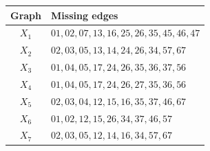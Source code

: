 \begin{tabular}{cl}
\toprule
Graph & Missing edges\\\midrule
\(X_1\)&\(01,02,07,13,16,25,26,35,45,46,47\)\\
\(X_2\)&\(02,03,05,13,14,24,26,34,57,67\)\\
\(X_3\)&\(01,04,05,17,24,26,35,36,37,56\)\\
\(X_4\)&\(01,04,05,17,24,26,27,35,36,56\)\\
\(X_5\)&\(02,03,04,12,15,16,35,37,46,67\)\\
\(X_6\)&\(01,02,12,15,26,34,37,46,57\)\\
\(X_7\)&\(02,03,05,12,14,16,34,57,67\)\\
\bottomrule
\end{tabular}
